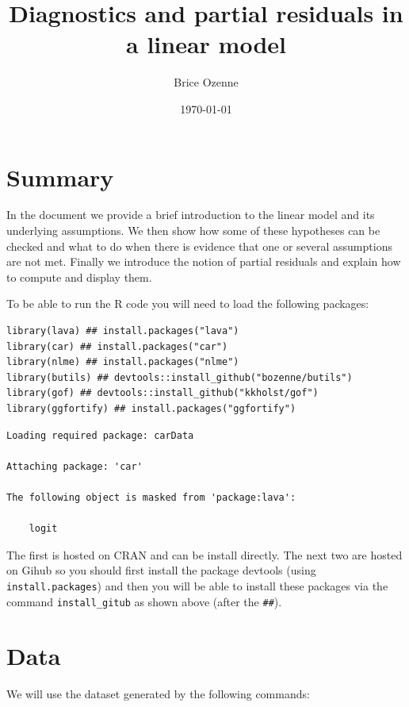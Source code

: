 \documentclass[12pt]{article}
\author{Brice Ozenne}
\date{\today}
\title{Diagnostics and partial residuals in a linear model}
\begin{document}
\maketitle

\section*{Summary}
\label{sec:org7291cd2}
In the document we provide a brief introduction to the linear model
and its underlying assumptions. We then show how some of these
hypotheses can be checked and what to do when there is evidence that
one or several assumptions are not met. Finally we introduce the
notion of partial residuals and explain how to compute and display
them.

\bigskip

To be able to run the R code you will need to load the following
packages:
\lstset{language=r,label= ,caption= ,captionpos=b,numbers=none}
\begin{lstlisting}
library(lava) ## install.packages("lava")
library(car) ## install.packages("car")
library(nlme) ## install.packages("nlme")
library(butils) ## devtools::install_github("bozenne/butils")
library(gof) ## devtools::install_github("kkholst/gof")
library(ggfortify) ## install.packages("ggfortify")
\end{lstlisting}

\begin{verbatim}
Loading required package: carData

Attaching package: 'car'

The following object is masked from 'package:lava':

    logit
\end{verbatim}

The first is hosted on CRAN and can be install directly. The next two
are hosted on Gihub so you should first install the package devtools
(using \texttt{install.packages}) and then you will be able to install these
packages via the command \texttt{install\_gitub} as shown above (after the
\texttt{\#\#}).

\clearpage

\section{Data}
\label{sec:orgba7ca44}

We will use the dataset generated by the following commands:
\end{document}
